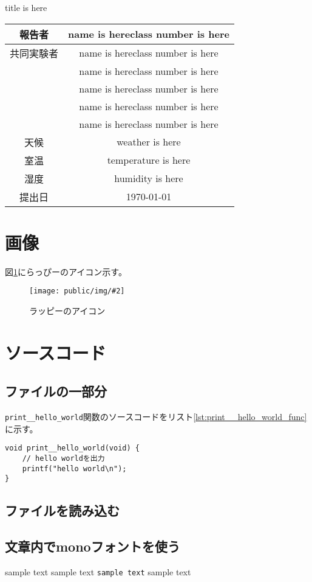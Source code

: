 \documentclass[paper=a4paper]{jlreq}
\newcommand{\TITLE}{title is here}
\newcommand{\NAME}{name is here}
\newcommand{\NUMBER}{class number is here}
\newcommand{\WEATHER}{weather is here}
\newcommand{\TEMPERATURE}{temperature is here}
\newcommand{\HUMIDITY}{humidity is here}
\newcommand{\Figure}[4]{
  \begin{figure}[H]
    \centering
    \texttt{[image: public/img/\#2]}
    \caption{#3}
    \label{fig:#4}
  \end{figure}
}
\newcommand{\Inline}[1]{\lstinline[style=inline]{#1}}
\begin{document}
{\centering \LARGE \TITLE \par}

\begin{table}[b]
  \centering
  \begin{tabular}{|c|c|}
    \hline
    報告者   & \NAME \quad \NUMBER \\
    \hline
    共同実験者 & \NAME \quad \NUMBER \\
          & \NAME \quad \NUMBER \\
          & \NAME \quad \NUMBER \\
          & \NAME \quad \NUMBER \\
          & \NAME \quad \NUMBER \\
    \hline
    天候    & \WEATHER            \\
    \hline
    室温    & \TEMPERATURE        \\
    \hline
    湿度    & \HUMIDITY           \\
    \hline
    提出日   & \today              \\
    \hline
  \end{tabular}
\end{table}

\newpage


\section{画像}
図\ref{fig:rhappy_icon}にらっぴーのアイコン示す。
\Figure{0.5}{rhappy_icon.jpg}{ラッピーのアイコン}{rhappy_icon}

\section{ソースコード}
\subsection{ファイルの一部分}
\Inline{print__hello_world}関数のソースコードをリスト\ref{lst:print__hello_world_func}に示す。

\begin{lstlisting}[caption={print\_\_hello\_world関数のソースコード}, label={lst:print__hello_world_func}]
void print__hello_world(void) {
    // hello worldを出力
    printf("hello world\n");
}
\end{lstlisting}

\subsection{ファイルを読み込む}


\subsection{文章内でmonoフォントを使う}
sample text sample text \Inline{sample text} sample text
\end{document}
